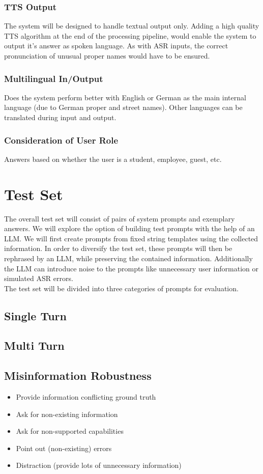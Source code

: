 \documentclass{article}
\begin{document}
\subsubsection{TTS Output}
The system will be designed to handle textual output only. Adding a high quality TTS algorithm at the end of the processing pipeline, would enable the system to output it's answer as spoken language. As with ASR inputs, the correct pronunciation of unusual proper names would have to be ensured.

\subsubsection{Multilingual In/Output}
Does the system perform better with English or German as the main internal language (due to German proper and street names). Other languages can be translated during input and output.

\subsubsection{Consideration of User Role}
Answers based on whether the user is a student, employee, guest, etc.


\section{Test Set}
The overall test set will consist of pairs of system prompts and exemplary answers. We will explore the option of building test prompts with the help of an LLM. We will first create prompts from fixed string templates using the collected information. In order to diversify the test set, these prompts will then be rephrased by an LLM, while preserving the contained information. Additionally the LLM can introduce noise to the prompts like unnecessary user information or simulated ASR errors.\\

The test set will be divided into three categories of prompts for evaluation.

\subsection{Single Turn}

\subsection{Multi Turn}

\subsection{Misinformation Robustness}
\begin{itemize}
    \item Provide information conflicting ground truth
    \item Ask for non-existing information
    \item Ask for non-supported capabilities
    \item Point out (non-existing) errors
    \item Distraction (provide lots of unnecessary information) 
\end{itemize}
\end{document}

